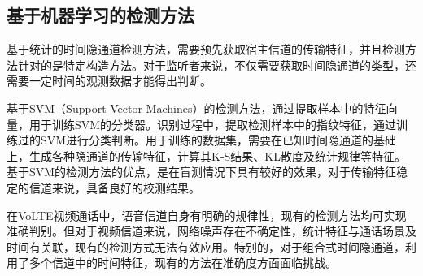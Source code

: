 \subsection{基于机器学习的检测方法}
\label{chap:backinfo:detect:machine}

基于统计的时间隐通道检测方法，需要预先获取宿主信道的传输特征，并且检测方法针对的是特定构造方法。对于监听者来说，不仅需要获取时间隐通道的类型，还需要一定时间的观测数据才能得出判断。

基于SVM（Support Vector Machines）的检测方法，通过提取样本中的特征向量，用于训练SVM的分类器。识别过程中，提取检测样本中的指纹特征，通过训练过的SVM进行分类判断。用于训练的数据集，需要在已知时间隐通道的基础上，生成各种隐通道的传输特征，计算其K-S结果、KL散度及统计规律等特征。基于SVM的检测方法的优点，是在盲测情况下具有较好的效果，对于传输特征稳定的信道来说，具备良好的校测结果。

在VoLTE视频通话中，语音信道自身有明确的规律性，现有的检测方法均可实现准确判别。但对于视频信道来说，网络噪声存在不确定性，统计特征与通话场景及时间有关联，现有的检测方式无法有效应用。特别的，对于组合式时间隐通道，利用了多个信道中的时间特征，现有的方法在准确度方面面临挑战。